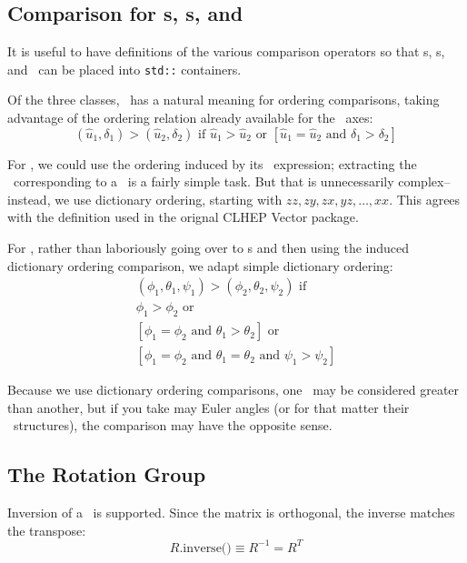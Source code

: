 \subsection{Comparison for \protect\Ro s, \protect\Ax s, and \protect\Es\ }

It is useful to have definitions of the various comparison operators
so that \Ro s, \Ax s, and \Es\ can be placed into {\tt std::} containers.

Of the three classes, \Ax\ has a natural meaning for ordering comparisons,
taking advantage of the ordering relation already available for the \UV\
axes:
\begin{equation}
\label{eq:ordrot}
  ( \hat{u}_1 , \delta_1 ) > ( \hat{u}_2 , \delta_2 ) \mbox{ if }
	\hat{u}_1 > \hat{u}_2  \mbox { or } \left[
	\hat{u}_1 = \hat{u}_2  \mbox { and }
	\delta_1 > \delta_2  \right]
\end{equation}

For \Rotation, we could use the ordering induced by its \Ax\ expression;
extracting the \Ax\ corresponding to a \Ro\ is a fairly simple task.  
But that is unnecessarily complex--instead, we use dictionary ordering,
starting with $zz, zy, zx, yz, \ldots, xx$.  This agrees with the definition
used in the orignal CLHEP Vector package.

For \Es, rather than laboriously going over to \Ro s and then using the
induced dictionary ordering comparison, we adapt simple dictionary ordering:
\begin{eqnarray}
  ( \phi_1 , \theta_1, \psi_1 ) > ( \phi_2 , \theta_2, \psi_2 ) \mbox{ if }
	\nonumber \\
	\phi_1 > \phi_2  \mbox { or }
	\nonumber \\
	\left[
	\phi_1 = \phi_2  \mbox { and } 	\theta_1 > \theta_2  \right]
	\mbox { or }
	\nonumber \\
	\left[
	\phi_1 = \phi_2  \mbox { and } 	\theta_1 = \theta_2
	\mbox { and } \psi_1 > \psi_2
	\right]
\end{eqnarray}

Because we use dictionary ordering comparisons, one \Ro\ may be considered
greater than another, but if you take may Euler angles (or for that matter
their \Ax\ structures), the comparison may have the opposite sense.

\subsection{The Rotation Group}

Inversion of a \Ro\ is supported.  Since the matrix is orthogonal,
the inverse matches the transpose:
\[
  R\mbox{.inverse()} \equiv R^{-1} = R^T
\]

